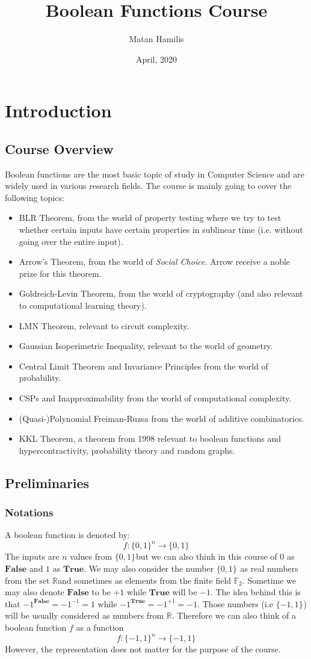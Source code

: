 \documentclass[a4paper,titlepage,twocolumn]{book}
\title{Boolean Functions Course}
\author{Matan Hamilis}
\date{April, 2020}
\theoremstyle{definition}
\newcommand{\bftext}[1]{\ensuremath{\mathbf{#1}}}
\newcommand{\False}{\bftext{False}}
\newcommand{\True}{\bftext{True}}
\newcommand{\ZO}[1][]{\ensuremath{\{0,1\}^{#1}}}
\newcommand{\MO}[1][]{\ensuremath{\{-1,1\}^{#1}}}
\newcommand{\ntoone}[1]{\ensuremath{#1:\ZO[n]\rightarrow\ZO}}
\newcommand{\MOntoone}[1]{\ensuremath{#1:\MO[n]\rightarrow\MO}}
\newcommand{\Reals}{\ensuremath{\mathbb{R}}}
\newcommand{\Ftwo}{\ensuremath{\mathbb{F}_2}}
\begin{document}
	\maketitle
	\tableofcontents
	\chapter{Introduction}
	\section{Course Overview}
	Boolean functions are the most basic topic of study in Computer Science and are widely used in various research fields. The course is mainly going to cover the following topics:
	\begin{itemize}
		\item BLR Theorem, from the world of property testing where we try to test whether certain inputs have certain properties in sublinear time (i.e. without going over the entire input).
		\item Arrow's Theorem, from the world of \emph{Social Choice}. Arrow receive a noble prize for this theorem.
		\item Goldreich-Levin Theorem, from the world of cryptography (and also relevant to computational learning theory).
		\item LMN Theorem, relevant to circuit complexity.
		\item Gaussian Isoperimetric Inequality, relevant to the world of geometry.
		\item Central Limit Theorem and Invariance Principles from the world of probability.
		\item CSPs and Inapproximability from the world of computational complexity.
		\item (Quasi-)Polynomial Freiman-Ruzsa from the world of additive combinatorics.
		\item KKL Theorem, a theorem from 1998 relevant to boolean functions and hypercontractivity, probability theory and random graphs.
	\end{itemize}
\section{Preliminaries}
	\subsection{Notations}
	A boolean function is denoted by: \[\ntoone{f}\] 
	The inputs are $n$ values from \ZO but we can also think in this course of $0$ as \False{} and $1$ as \True. We may also consider the number \ZO{} as real numbers from the set \Reals and sometimes as elements from the finite field \Ftwo. Sometime we may also denote \False{} to be $+1$ while \True{} will be $-1$. The idea behind this is that $-1^{\False} = -1^{-1} = 1$ while $-1 ^ {\True} = -1^{+1} =-1$. Those numbers (i.e \MO) will be usually considered as numbers from \Reals.
	Therefore we can also think of a boolean function $f$ as a function \[\MOntoone{f}\]
	However, the representation does not matter for the purpose of the course.
\end{document}

